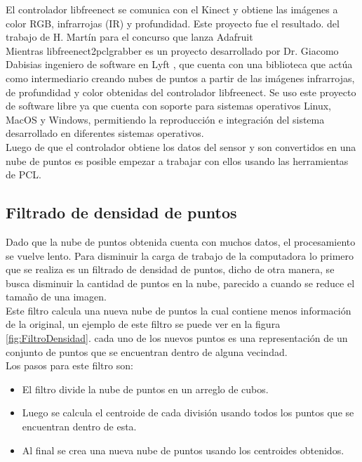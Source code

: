         El \gls{controlador} libfreenect \cite{libfreenect} se comunica con el Kinect y obtiene las imágenes a color RGB, infrarrojas (IR) y profundidad. Este proyecto fue el resultado. del trabajo de H. Martín para el concurso que
        lanza Adafruit \cite{UsodelKi56:online} \\ 
        
        
       
        
        Mientras libfreenect2pclgrabber \cite{k2g} es un proyecto desarrollado por Dr. Giacomo Dabisias ingeniero de software en Lyft \cite{k2g},  que cuenta con una biblioteca que actúa como intermediario creando nubes de puntos a partir de las imágenes infrarrojas, de profundidad y color obtenidas del controlador libfreenect. Se uso este proyecto de software libre ya que cuenta con soporte para sistemas operativos Linux, MacOS y Windows, permitiendo la reproducción e integración del sistema desarrollado en diferentes sistemas operativos.  \\ 
        
        Luego de que el controlador obtiene los datos del sensor y son convertidos en una nube de puntos es posible empezar a trabajar con ellos usando las herramientas de PCL.\\
    
    \subsection{Filtrado de densidad de puntos}
    
        Dado que la nube de puntos obtenida cuenta con muchos datos, el procesamiento se vuelve lento. Para disminuir la carga de trabajo de la computadora lo primero que se realiza es un filtrado de densidad de puntos, dicho de otra manera, se busca disminuir la cantidad de puntos en la nube, parecido a cuando se reduce el tamaño de una imagen.\\
        
        Este \gls{filtro} calcula una nueva nube de puntos la cual contiene menos información de la original, un ejemplo de este filtro se puede ver en la figura \ref{fig:FiltroDensidad}. cada uno de los nuevos puntos es una representación de un conjunto de puntos que se encuentran dentro de alguna vecindad.\\
        
        Los pasos para este filtro son:
        \begin{itemize}
            \item El filtro divide la nube de puntos en un arreglo de cubos.
            \item Luego se calcula el centroide de cada división usando todos los puntos que se encuentran dentro de esta.
            \item Al final se crea una nueva nube de puntos usando los centroides obtenidos.
        \end{itemize}
        
